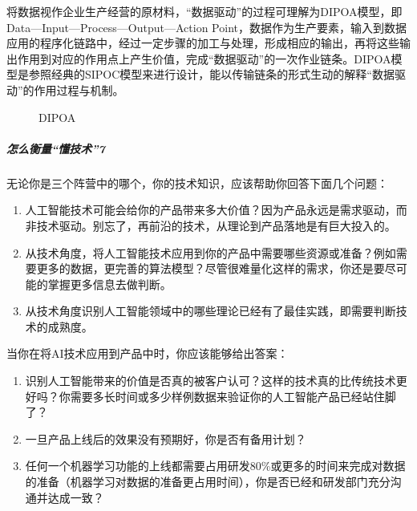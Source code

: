 \documentclass[letterpaper,10pt,english]{sphinxmanual}
\begin{document}
将数据视作企业生产经营的原材料，“数据驱动”的过程可理解为DIPOA模型，即Data—Input—Process—Output—Action
Point，数据作为生产要素，输入到数据应用的程序化链路中，经过一定步骤的加工与处理，形成相应的输出，再将这些输出作用到对应的作用点上产生价值，完成“数据驱动”的一次作业链条。DIPOA模型是参照经典的SIPOC模型来进行设计，能以传输链条的形式生动的解释“数据驱动”的作用过程与机制。

\begin{figure}[H]
\centering
\capstart

\noindent{}
\caption{DIPOA}\label{\detokenize{chapter_introduction/AI_PM:id53}}\end{figure}


\subparagraph{怎么衡量“懂技术”7\sphinxfootnotemark[281]}
\label{\detokenize{chapter_introduction/AI_PM:id12}}%
\begin{footnotetext}[281]\sphinxAtStartFootnote
{}
%
\end{footnotetext}\ignorespaces 
无论你是三个阵营中的哪个，你的技术知识，应该帮助你回答下面几个问题：
\begin{enumerate}
%
\item {} 
人工智能技术可能会给你的产品带来多大价值？因为产品永远是需求驱动，而非技术驱动。别忘了，再前沿的技术，从理论到产品落地是有巨大投入的。

\item {} 
从技术角度，将人工智能技术应用到你的产品中需要哪些资源或准备？例如需要更多的数据，更完善的算法模型？尽管很难量化这样的需求，你还是要尽可能的掌握更多信息去做判断。

\item {} 
从技术角度识别人工智能领域中的哪些理论已经有了最佳实践，即需要判断技术的成熟度。

\end{enumerate}

当你在将AI技术应用到产品中时，你应该能够给出答案：
\begin{enumerate}
%
\item {} 
识别人工智能带来的价值是否真的被客户认可？这样的技术真的比传统技术更好吗？你需要多长时间或多少样例数据来验证你的人工智能产品已经站住脚了？

\item {} 
一旦产品上线后的效果没有预期好，你是否有备用计划？

\item {} 
任何一个机器学习功能的上线都需要占用研发80\%或更多的时间来完成对数据的准备（机器学习对数据的准备更占用时间），你是否已经和研发部门充分沟通并达成一致？

\end{enumerate}
\end{document}
